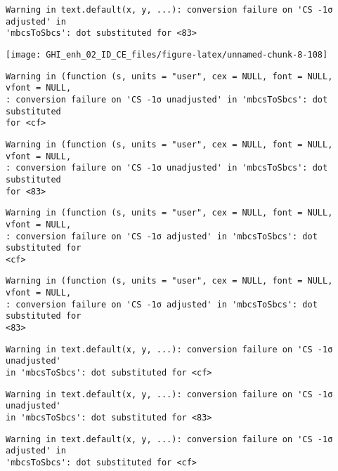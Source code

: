 \documentclass[
  10pt,
  a4paper,oneside]{article}
\begin{document}
\begin{verbatim}
Warning in text.default(x, y, ...): conversion failure on 'CS -1σ adjusted' in
'mbcsToSbcs': dot substituted for <83>
\end{verbatim}

\begin{center}\texttt{[image: GHI\_enh\_02\_ID\_CE\_files/figure-latex/unnamed-chunk-8-108]} \end{center}

\begin{verbatim}
Warning in (function (s, units = "user", cex = NULL, font = NULL, vfont = NULL,
: conversion failure on 'CS -1σ unadjusted' in 'mbcsToSbcs': dot substituted
for <cf>
\end{verbatim}

\begin{verbatim}
Warning in (function (s, units = "user", cex = NULL, font = NULL, vfont = NULL,
: conversion failure on 'CS -1σ unadjusted' in 'mbcsToSbcs': dot substituted
for <83>
\end{verbatim}

\begin{verbatim}
Warning in (function (s, units = "user", cex = NULL, font = NULL, vfont = NULL,
: conversion failure on 'CS -1σ adjusted' in 'mbcsToSbcs': dot substituted for
<cf>
\end{verbatim}

\begin{verbatim}
Warning in (function (s, units = "user", cex = NULL, font = NULL, vfont = NULL,
: conversion failure on 'CS -1σ adjusted' in 'mbcsToSbcs': dot substituted for
<83>
\end{verbatim}

\begin{verbatim}
Warning in text.default(x, y, ...): conversion failure on 'CS -1σ unadjusted'
in 'mbcsToSbcs': dot substituted for <cf>
\end{verbatim}

\begin{verbatim}
Warning in text.default(x, y, ...): conversion failure on 'CS -1σ unadjusted'
in 'mbcsToSbcs': dot substituted for <83>
\end{verbatim}

\begin{verbatim}
Warning in text.default(x, y, ...): conversion failure on 'CS -1σ adjusted' in
'mbcsToSbcs': dot substituted for <cf>
\end{verbatim}
\end{document}
